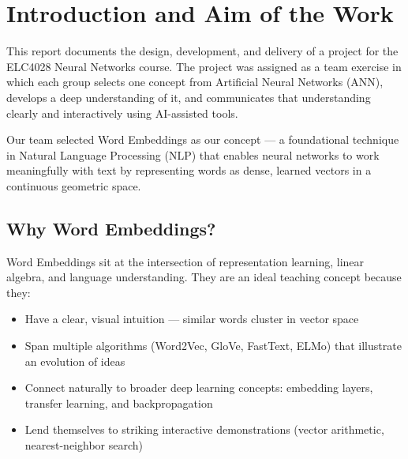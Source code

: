 \section{Introduction and Aim of the Work}

This report documents the design, development, and delivery of a project for the ELC4028 Neural Networks course. The project was assigned as a team exercise in which each group selects one concept from Artificial Neural Networks (ANN), develops a deep understanding of it, and communicates that understanding clearly and interactively using AI-assisted tools.

Our team selected Word Embeddings as our concept — a foundational technique in Natural Language Processing (NLP) that enables neural networks to work meaningfully with text by representing words as dense, learned vectors in a continuous geometric space.

\subsection{Why Word Embeddings?}
Word Embeddings sit at the intersection of representation learning, linear algebra, and language understanding. They are an ideal teaching concept because they:
\begin{itemize}
    \item Have a clear, visual intuition — similar words cluster in vector space
    \item Span multiple algorithms (Word2Vec, GloVe, FastText, ELMo) that illustrate an evolution of ideas
    \item Connect naturally to broader deep learning concepts: embedding layers, transfer learning, and backpropagation
    \item Lend themselves to striking interactive demonstrations (vector arithmetic, nearest-neighbor search)
\end{itemize}

